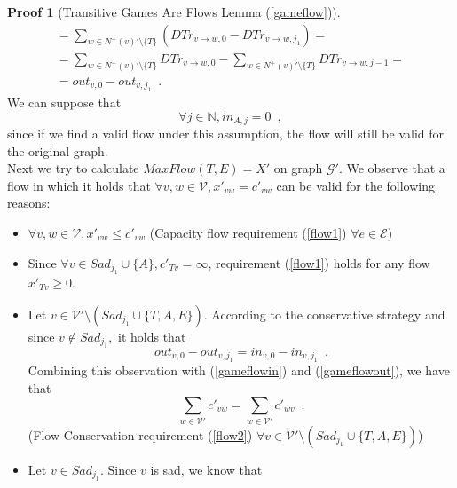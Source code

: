 \documentclass[11pt]{llncs}
\theoremstyle{definition}
\newtheorem{sepproof}{Proof}
\begin{document}
\begin{sepproof}[Transitive Games Are Flows Lemma (\ref{gameflow})]
\begin{equation}
\begin{gathered}
          = \sum\limits_{w \in N^{+}\left(v\right)' \setminus \{T\}}\left(DTr_{v \rightarrow w, 0} -
          DTr_{v \rightarrow w, j_1}\right) = \\
          = \sum\limits_{w \in N^{+}\left(v\right)' \setminus \{T\}}DTr_{v \rightarrow w, 0} -
          \sum\limits_{w \in N^{+}\left(v\right)' \setminus \{T\}}DTr_{v \rightarrow w, j-1} = \\
          = out_{v, 0} - out_{v, j_1} \enspace.
       \end{gathered}
       \end{equation}
       We can suppose that
       \begin{equation}
       \label{Aincoming}
          \forall j \in \mathbb{N}, in_{A, j} = 0 \enspace,
       \end{equation}
       since if we find a valid flow under this assumption, the flow will still be valid for the original graph. \\
       Next we try to calculate $MaxFlow\left(T, E\right) = X'$ on graph $\mathcal{G}'$. We observe that a flow in which it
       holds that $\forall v, w \in \mathcal{V}, x'_{vw} = c'_{vw}$ can be valid for the following reasons:
       \begin{itemize}
          \item $\forall v,w \in \mathcal{V}, x'_{vw} \leq c'_{vw}$ (Capacity flow requirement (\ref{flow1}) $\forall e \in
          \mathcal{E}$)
          \item Since $\forall v \in Sad_{j_1} \cup \{A\}, c'_{Tv} = \infty$, requirement (\ref{flow1}) holds for any flow
          $x'_{Tv} \geq 0$.
          \item Let $v \in \mathcal{V}' \setminus \left(Sad_{j_1} \cup \{T, A, E\}\right)$. According to the conservative
          strategy and since $v \notin Sad_{j_1},$ it holds that
          \begin{equation*}
             out_{v, 0} - out_{v, j_1} = in_{v, 0} - in_{v, j_1} \enspace.
          \end{equation*}
          Combining this observation with (\ref{gameflowin}) and (\ref{gameflowout}), we have that
          \begin{equation*}
             \sum\limits_{w \in \mathcal{V}'}c'_{vw} = \sum\limits_{w \in \mathcal{V}'}c'_{wv} \enspace.
          \end{equation*}
          (Flow Conservation requirement (\ref{flow2}) $\forall v \in \mathcal{V}' \setminus \left(Sad_{j_1}
          \cup \{T, A, E\}\right)$)
          \item Let $v \in Sad_{j_1}$. Since $v$ is sad, we know that

\end{itemize}
\end{sepproof}
\end{document}
